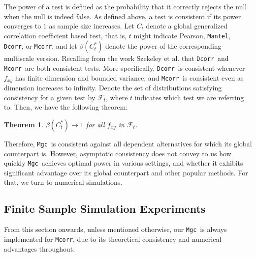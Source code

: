 \documentclass[11pt]{article}
\providecommand{\sct}[1]{{\sc \texttt{#1}}}
\providecommand{\mc}[1]{\mathcal{#1}}
\newcommand{\G}{C}
\newcommand{\Mgc}{\sct{Mgc}}
\newcommand{\Dcorr}{\sct{Dcorr}}
\newcommand{\Mcorr}{\sct{Mcorr}}
\newcommand{\Mantel}{\sct{Mantel}}
\newtheorem{thm}{Theorem}
\begin{document}
The power of a test is defined as the probability that it correctly rejects the null when the null is indeed false.  As defined above, a test is consistent if its power converges to $1$ as sample size increases.
Let $\G_t$ denote a global generalized correlation coefficient based test, that is, $t$ might indicate Pearson, \Mantel, \Dcorr, or \Mcorr, and let $\beta(\G_t^*)$ denote the power of the corresponding multiscale version.
Recalling from the work Szekeley et al. that \Dcorr~and \Mcorr~are both consistent tests. More specifically, \Dcorr~is consistent whenever $f_{xy}$ has finite dimension and bounded variance, and \Mcorr~is consistent even as dimension increases to infinity.  Denote the set of distributions satisfying consistency for a given test by $\mc{F}_t$, where $t$ indicates which test we are referring to. Then, we have the following theorem:
\begin{thm}
\label{thm1}
$\beta(\G_t^*) \rightarrow 1$ for all $f_{xy}$ in $\mc{F}_t$.
\end{thm}

Therefore, \Mgc~is consistent against all dependent alternatives for which its global counterpart is. However, asymptotic consistency does not convey to us how quickly \Mgc~achieves optimal power in various settings, and whether it exhibits significant advantage over its global counterpart and other popular methods.  For that, we turn to numerical simulations.

\subsection*{Finite Sample Simulation Experiments}

From this section onwards, unless mentioned otherwise, our \Mgc~is always implemented for \Mcorr, due to its theoretical consistency and numerical advantages throughout.
\end{document}
